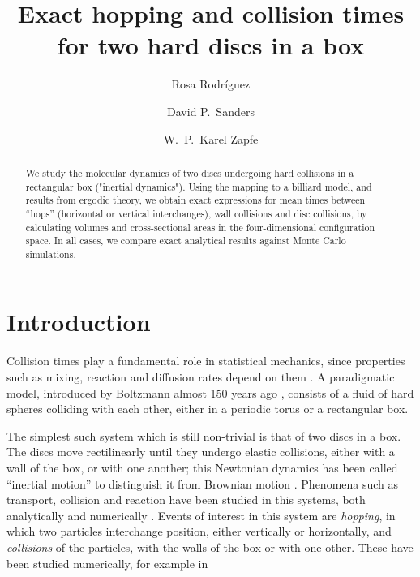\documentclass[superscriptaddress,pre,reprint,showpacs,onecolumn]{revtex4-1}
\begin{document}
\title{Exact hopping and collision times for two hard discs in a box}

\author{Rosa Rodríguez}

\author{David P.~Sanders}

\author{W.~P.~Karel Zapfe}



\begin{abstract}
We study the molecular dynamics of two discs undergoing hard collisions in a rectangular box ("inertial dynamics").
Using the mapping to a billiard model, and results from ergodic theory, we obtain exact expressions for mean times between ``hops'' (horizontal or vertical interchanges), wall collisions and disc collisions, by calculating
volumes and cross-sectional areas in the four-dimensional configuration space.
In all cases, we compare exact analytical results against Monte Carlo simulations.
\end{abstract}

\maketitle



\section{Introduction}


Collision times play a fundamental role in statistical mechanics, since properties
such as mixing, reaction and diffusion rates depend on them \cite{Boltz72, Tolman, VanKampen}.
A paradigmatic model, introduced by Boltzmann almost 150 years ago \cite{Boltz72, SzaszBook00},
consists of a fluid of hard spheres colliding with each other, either in a periodic torus or 
a rectangular box.

The simplest such system which is still non-trivial is that of two discs in a box.
The discs move rectilinearly until they undergo
elastic collisions, either with a wall of the box, or with one another; this Newtonian dynamics has been called ``inertial motion'' to distinguish it from Brownian motion \cite{Bowles04}.
Phenomena such as transport, collision and reaction
have been studied in this systems, both analytically 
 \cite{Awazu01, Munakata02, Suh05} and numerically \cite{MacElroy2005}.
 Events of interest in this system are \emph{hopping},
in which two particles interchange position, either vertically or horizontally, and
\emph{collisions} of the particles, with the walls of the box or with one other.
These have been studied numerically, for example in \cite{MacElroy2004}
 
\end{document}
